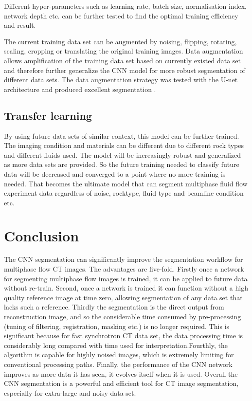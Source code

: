 \documentclass[draft,linenumbers]{agujournal2018}
\begin{document}
Different hyper-parameters such as learning rate, batch size, normalisation index, network depth etc. can be further tested to find the optimal training efficiency and result.

The current training data set can be augmented by noising, flipping, rotating, scaling, cropping or translating the original training images. Data augmentation allows amplification of the training data set based on currently existed data set and therefore further generalize the CNN model for more robust segmentation of different data sets. The data augmentation strategy was tested with the U-net architecture and produced excellent segmentation \citep{ronneberger2015u}. 

\subsection{Transfer learning}
By using future data sets of similar context, this model can be further trained. The imaging condition and materials can be different due to different rock types and different fluids used. The model will be increasingly robust and generalized as more data sets are provided. So the future training needed to classify future data will be decreased and converged to a point where no more training is needed. That becomes the ultimate model that can segment multiphase fluid flow experiment data regardless of noise, rocktype, fluid type and beamline condition etc.

\section{Conclusion}
The CNN segmentation can significantly improve the segmentation workflow for multiphase flow \textmu CT images. The advantages are five-fold. Firstly once a network for segmenting multiphase flow images is trained, it can be applied to future data without re-train. Second, once a network is trained it can function without a high quality reference image at time zero, allowing segmentation of any data set that lacks such a reference. Thirdly the segmentation is the direct output from reconstruction image, and so the considerable time consumed by pre-processing (tuning of filtering, registration, masking etc.) is no longer required. This is significant because for fast synchrotron \textmu CT data set, the data processing time is considerably long compared with time used for interpretation.Fourthly, the algorithm is capable for highly noised images, which is extremely limiting for conventional processing paths. Finally, the performance of the CNN network improves as more data it has seen, it evolves itself when it is used. Overall the CNN segmentation is a powerful and efficient tool for \textmu CT image segmentation, especially for extra-large and noisy data set.
\end{document}
